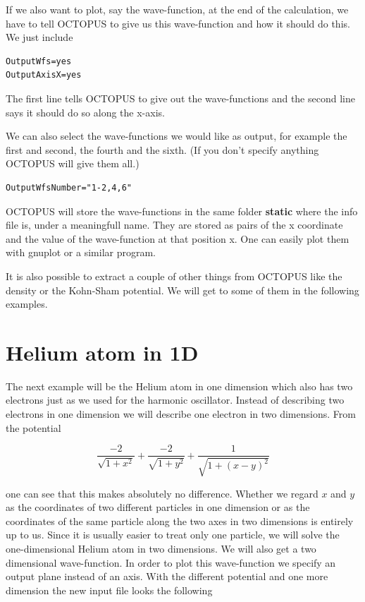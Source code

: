 \documentclass{article}
\begin{document}
If we also want to plot, say the wave-function, at the end of the calculation,
we have to tell OCTOPUS to give us this wave-function and how it should do this.
We just include

\begin{verbatim}
OutputWfs=yes
OutputAxisX=yes
\end{verbatim}

The first line tells OCTOPUS to give out the wave-functions and the second line
says it should do so along the x-axis.

We can also select the wave-functions we would like as output, for example the
first and second, the fourth and the sixth. (If you don't specify anything
OCTOPUS will give them all.)

\begin{verbatim}
OutputWfsNumber="1-2,4,6"
\end{verbatim}

OCTOPUS will store the wave-functions in the same folder {\bf static} where the
info file is, under a meaningfull name. They are stored as pairs of the x
coordinate and the value of the wave-function at that position x. One can
easily plot them with gnuplot or a similar program.

It is also possible to extract a couple of other things from OCTOPUS like the
density or the Kohn-Sham potential. We will get to some of them in the following
examples.

\section{Helium atom in 1D}

The next example will be the Helium atom in one dimension which also has two
electrons just as we used for the harmonic oscillator. Instead of describing two
electrons in one dimension we will describe one electron in two dimensions. From
the potential 

\begin{equation}
\frac{-2}{\sqrt{1+x^2}}+\frac{-2}{\sqrt{1+y^2}}+\frac{1}{\sqrt{1+(x-y)^2}}
\end{equation}

one can see that this makes absolutely no difference. Whether we regard $x$ and
$y$ as the coordinates of two different particles in one dimension or as the
coordinates of the same particle along the two axes in two dimensions is
entirely up to us. Since it is usually easier to treat only one particle, we
will solve the one-dimensional Helium atom in two dimensions.
We will also get a two dimensional wave-function. In order to plot this
wave-function we specify an output plane instead of an axis. With the different
potential and one more dimension the new input file looks the following
\end{document}
